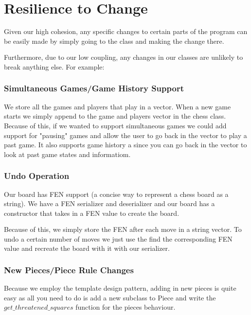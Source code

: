 \documentclass[12pt]{article}
\begin{document}
\section*{Resilience to Change}

Given our high cohesion, any
specific changes to certain parts of the program
can be easily made by simply going to the class
and making the change there.

\bigskip

Furthermore, due to our low coupling, any changes in
our classes are unlikely to break anything else.
For example:

\subsubsection*{Simultaneous Games/Game History Support}

We store all the games and players that 
play in a vector. When a new game starts
we simply append to the game and players
vector in the chess class. Because of this,
if we wanted to support simultaneous games
we could add support for "pausing" games
and allow the user to go back in the vector
to play a past game. It also supports
game history a since you can
go back in the vector to look at
past game states and informatiom.

\subsubsection*{Undo Operation}

Our board has FEN support 
(a concise way to represent a chess board as a string).
We have a FEN serializer and deserializer and our
board has a constructor that takes in a FEN 
value to create the board. 

\bigskip

Because of this, we simply store the FEN
after each move in a string vector. 
To undo a certain number of moves we just
use the find the corresponding FEN value and recreate
the board with it with our serializer.


\subsubsection*{New Pieces/Piece Rule Changes}

Because we employ the template design pattern,
adding in new pieces is quite easy
as all you need to do is add a new subclass
to Piece and write the $get\_threatened\_squares$
function for the pieces behaviour.
\end{document}
